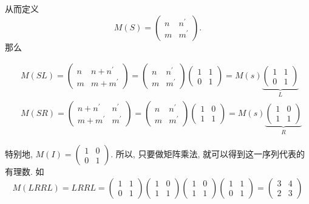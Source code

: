 \documentclass{ctexart}
\begin{document}
从而定义$$M(S)=\left(\begin{array}{ll}n & n^{\prime} \\ m & m^{\prime}\end{array}\right).$$那么

\[
    \begin{aligned} & M(SL)=\left(\begin{array}{cc}
n & n+n^{\prime}\\
m & m+m^{\prime}
\end{array}\right)=\left(\begin{array}{ll}
n & n^{\prime}\\
m & m^{\prime}
\end{array}\right)\left(\begin{array}{ll}
1 & 1\\
0 & 1
\end{array}\right)=M(s)\underbrace{\left(\begin{array}{ll}
1 & 1\\
0 & 1
\end{array}\right)}_{L}\\
 & M(SR)=\left(\begin{array}{ll}
n+n^{\prime} & n^{\prime}\\
m+m^{\prime} & m^{\prime}
\end{array}\right)=\left(\begin{array}{ll}
n & n^{\prime}\\
m & m^{\prime}
\end{array}\right)\left(\begin{array}{ll}
1 & 0\\
1 & 1
\end{array}\right)=M(s)\underbrace{\left(\begin{array}{ll}
1 & 0\\
1 & 1
\end{array}\right)}_{R}
\end{aligned}
\]

特别地, $M(I)=\left(\begin{array}{ll}1 & 0 \\ 0 & 1\end{array}\right)$. 
所以, 只要做矩阵乘法, 就可以得到这一序列代表的有理数. 如
$$
M(LRRL)=LRRL=\begin{pmatrix}1 & 1\\
    0 & 1
    \end{pmatrix}\begin{pmatrix}1 & 0\\
    1 & 1
    \end{pmatrix}\begin{pmatrix}1 & 0\\
    1 & 1
    \end{pmatrix}\begin{pmatrix}1 & 1\\
    0 & 1
    \end{pmatrix}=\begin{pmatrix}3 & 4\\
    2 & 3
    \end{pmatrix}
$$
\end{document}
